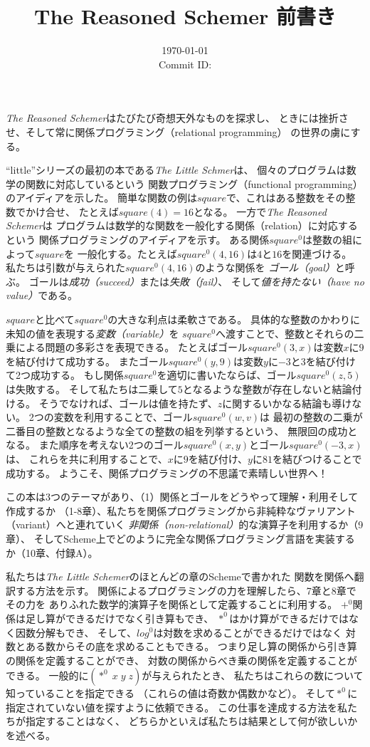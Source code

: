 \documentclass[uplatex, dvipdfmx, ja=standard, a6paper, 9pt]{bxjsarticle}
\date{\today \\
  {\small Commit ID: \href{https://github.com/y-yu/trs-preface}{\GITAbrHash}}
}
\title{The Reasoned Schemer 前書き}
\begin{document}
\maketitle

\textit{The Reasoned Schemer}はたびたび奇想天外なものを探求し、
ときには挫折させ、そして常に関係プログラミング（relational programming）
の世界の虜にする。

``little''シリーズの最初の本である\emph{The Little Schmer}は、
個々のプログラムは数学の関数に対応しているという
関数プログラミング（functional programming）のアイディアを示した。
簡単な関数の例は$square$で、これはある整数をその整数でかけ合せ、
たとえば$square(4) = 16$となる。
一方で\emph{The Reasoned Schemer}は
プログラムは数学的な関数を一般化する関係（relation）に対応するという
関係プログラミングのアイディアを示す。
ある関係$square^0$は整数の組によって$square$を
一般化する。たとえば$square^0(4, 16)$は$4$と$16$を関連づける。
私たちは引数が与えられた$square^0(4, 16)$のような関係を
\emph{ゴール（goal）}と呼ぶ。
ゴールは\emph{成功（succeed）}または\emph{失敗（fail）}、
そして\emph{値を持たない（have no value）}である。

$square$と比べて$square^0$の大きな利点は柔軟さである。
具体的な整数のかわりに未知の値を表現する\emph{変数（variable）}を
$square^0$へ渡すことで、整数とそれらの二乗による問題の多彩さを表現できる。
たとえばゴール$square^0(3, x)$は変数$x$に$9$を結び付けて成功する。
またゴール$square^0(y, 9)$は変数$y$に$-3$と$3$を結び付けて2つ成功する。
もし関係$square^0$を適切に書いたならば、ゴール$square^0(z, 5)$は失敗する。
そして私たちは二乗して$5$となるような整数が存在しないと結論付ける。
そうでなければ、ゴールは値を持たず、$z$に関するいかなる結論も導けない。
2つの変数を利用することで、ゴール$square^0(w, v)$は
最初の整数の二乗が二番目の整数となるような全ての整数の組を列挙するという、
無限回の成功となる。
また順序を考えない2つのゴール$square^0(x, y)$とゴール$square^0(-3, x)$は、
これらを共に利用することで、$x$に$9$を結び付け、$y$に$81$を結びつけることで成功する。
ようこそ、関係プログラミングの不思議で素晴しい世界へ！

この本は3つのテーマがあり、（1）関係とゴールをどうやって理解・利用そして作成するか
（1-8章）、私たちを関係プログラミングから非純粋なヴァリアント（variant）へと連れていく
\emph{非関係（non-relational）}的な演算子を利用するか（9章）、
そしてScheme上でどのように完全な関係プログラミング言語を実装するか（10章、付録A）。

私たちは\emph{The Little Schemer}のほとんどの章のSchemeで書かれた
関数を関係へ翻訳する方法を示す。
関係によるプログラミングの力を理解したら、7章と8章でその力を
ありふれた数学的演算子を関係として定義することに利用する。
$+^0$関係は足し算ができるだけでなく引き算もでき、
$*^0$はかけ算ができるだけではなく因数分解もでき、
そして、$log^0$は対数を求めることができるだけではなく
対数とある数からその底を求めることもできる。
つまり足し算の関係から引き算の関係を定義することができ、
対数の関係からべき乗の関係を定義することができる。
一般的に$(*^0\; x\; y\; z)$が与えられたとき、
私たちはこれらの数について知っていることを指定できる
（これらの値は奇数か偶数かなど）。
そして$*^0$に指定されていない値を探すように依頼できる。
この仕事を達成する方法を私たちが指定することはなく、
どちらかといえば私たちは結果として何が欲しいかを述べる。
\end{document}
